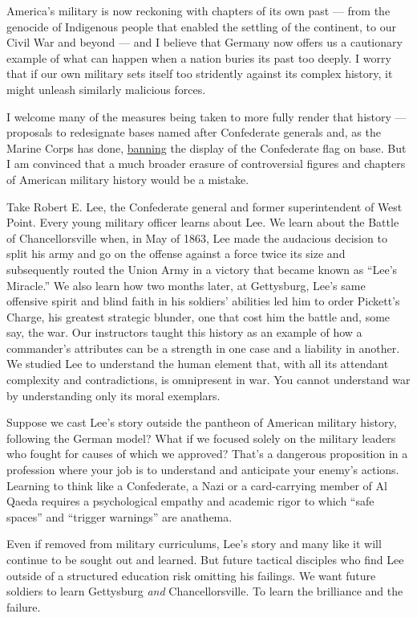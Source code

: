 America's military is now reckoning with chapters of its own past ---
from the genocide of Indigenous people that enabled the settling of the
continent, to our Civil War and beyond --- and I believe that Germany
now offers us a cautionary example of what can happen when a nation
buries its past too deeply. I worry that if our own military sets itself
too stridently against its complex history, it might unleash similarly
malicious forces.

I welcome many of the measures being taken to more fully render that
history --- proposals to redesignate bases named after Confederate
generals and, as the Marine Corps has done,
\href{https://www.nytimes.com/2020/06/06/us/marines-confederate-flag-ban.html}{banning}
the display of the Confederate flag on base. But I am convinced that a
much broader erasure of controversial figures and chapters of American
military history would be a mistake.

Take Robert E. Lee, the Confederate general and former superintendent of
West Point. Every young military officer learns about Lee. We learn
about the Battle of Chancellorsville when, in May of 1863, Lee made the
audacious decision to split his army and go on the offense against a
force twice its size and subsequently routed the Union Army in a victory
that became known as ``Lee's Miracle.'' We also learn how two months
later, at Gettysburg, Lee's same offensive spirit and blind faith in his
soldiers' abilities led him to order Pickett's Charge, his greatest
strategic blunder, one that cost him the battle and, some say, the war.
Our instructors taught this history as an example of how a commander's
attributes can be a strength in one case and a liability in another. We
studied Lee to understand the human element that, with all its attendant
complexity and contradictions, is omnipresent in war. You cannot
understand war by understanding only its moral exemplars.

Suppose we cast Lee's story outside the pantheon of American military
history, following the German model? What if we focused solely on the
military leaders who fought for causes of which we approved? That's a
dangerous proposition in a profession where your job is to understand
and anticipate your enemy's actions. Learning to think like a
Confederate, a Nazi or a card-carrying member of Al Qaeda requires a
psychological empathy and academic rigor to which ``safe spaces'' and
``trigger warnings'' are anathema.

Even if removed from military curriculums, Lee's story and many like it
will continue to be sought out and learned. But future tactical
disciples who find Lee outside of a structured education risk omitting
his failings. We want future soldiers to learn Gettysburg \emph{and}
Chancellorsville. To learn the brilliance and the failure.

